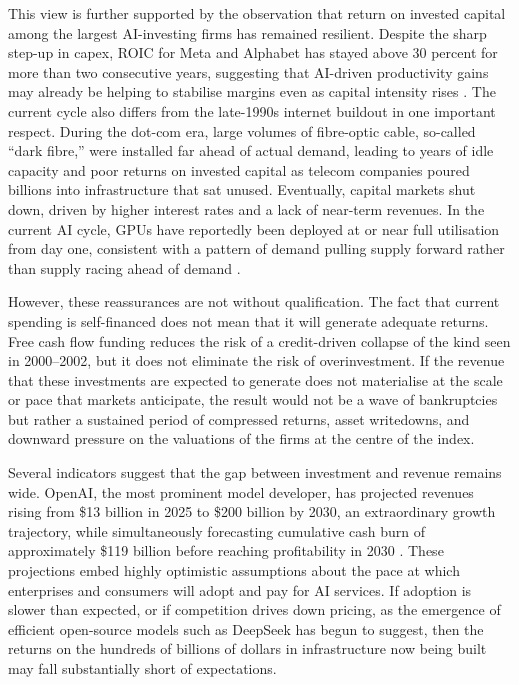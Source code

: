 This view is further supported by the observation that return on invested capital among the largest AI-investing firms has remained resilient. Despite the sharp step-up in capex, ROIC for Meta and Alphabet has stayed above 30 percent for more than two consecutive years, suggesting that AI-driven productivity gains may already be helping to stabilise margins even as capital intensity rises \citep{ojjehFronczke2026}. The current cycle also differs from the late-1990s internet buildout in one important respect. During the dot-com era, large volumes of fibre-optic cable, so-called ``dark fibre,'' were installed far ahead of actual demand, leading to years of idle capacity and poor returns on invested capital as telecom companies poured billions into infrastructure that sat unused. Eventually, capital markets shut down, driven by higher interest rates and a lack of near-term revenues. In the current AI cycle, GPUs have reportedly been deployed at or near full utilisation from day one, consistent with a pattern of demand pulling supply forward rather than supply racing ahead of demand \citep{golan2025}.
 
However, these reassurances are not without qualification. The fact that current spending is self-financed does not mean that it will generate adequate returns. Free cash flow funding reduces the risk of a credit-driven collapse of the kind seen in 2000--2002, but it does not eliminate the risk of overinvestment. If the revenue that these investments are expected to generate does not materialise at the scale or pace that markets anticipate, the result would not be a wave of bankruptcies but rather a sustained period of compressed returns, asset writedowns, and downward pressure on the valuations of the firms at the centre of the index.
 
Several indicators suggest that the gap between investment and revenue remains wide. OpenAI, the most prominent model developer, has projected revenues rising from \$13 billion in 2025 to \$200 billion by 2030, an extraordinary growth trajectory, while simultaneously forecasting cumulative cash burn of approximately \$119 billion before reaching profitability in 2030 \citep{mercer2025}. These projections embed highly optimistic assumptions about the pace at which enterprises and consumers will adopt and pay for AI services. If adoption is slower than expected, or if competition drives down pricing, as the emergence of efficient open-source models such as DeepSeek has begun to suggest, then the returns on the hundreds of billions of dollars in infrastructure now being built may fall substantially short of expectations.
 

